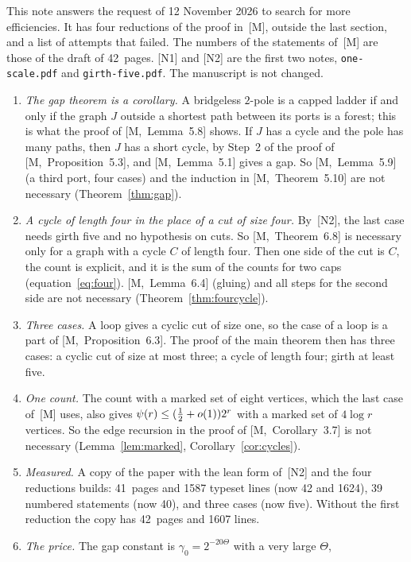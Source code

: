 \documentclass[11pt]{article}
\newcommand{\M}[1]{[M,~#1]}
\begin{document}
\maketitleblock

This note answers the request of 12 November 2026 to search for more efficiencies. It has four
reductions of the proof in~[M], outside the last section, and a list of attempts that failed.
The numbers of the statements of~[M] are those of the draft of 42~pages. [N1] and [N2] are the
first two notes, \texttt{one-scale.pdf} and \texttt{girth-five.pdf}. The manuscript is not changed.

\begin{enumerate}[leftmargin=1.6em]
\item \emph{The gap theorem is a corollary.} A bridgeless $2$-pole is a capped ladder if and only
if the graph $J$ outside a shortest path between its ports is a forest; this is what the proof of
\M{Lemma~5.8} shows. If $J$ has a cycle and the pole has many paths, then $J$ has a short cycle,
by Step~2 of the proof of \M{Proposition~5.3}, and \M{Lemma~5.1} gives a gap. So
\M{Lemma~5.9} (a third port, four cases) and the induction in \M{Theorem~5.10} are not necessary
(Theorem~\ref{thm:gap}).
\item \emph{A cycle of length four in the place of a cut of size four.} By~[N2], the last case
needs girth five and no hypothesis on cuts. So \M{Theorem~6.8} is necessary only for a graph with
a cycle $C$ of length four. Then one side of the cut is $C$, the count is explicit, and it is the
sum of the counts for two caps (equation~\eqref{eq:four}). \M{Lemma~6.4} (gluing) and all steps
for the second side are not necessary (Theorem~\ref{thm:fourcycle}).
\item \emph{Three cases.} A loop gives a cyclic cut of size one, so the case of a loop is a part
of \M{Proposition~6.3}. The proof of the main theorem then has three cases: a cyclic cut of size
at most three; a cycle of length four; girth at least five.
\item \emph{One count.} The count with a marked set of eight vertices, which the last case of~[M]
uses, also gives $\psi(r)\le(\tfrac12+o(1))2^{r}$ with a marked set of $4\log r$ vertices. So the
edge recursion in the proof of \M{Corollary~3.7} is not necessary
(Lemma~\ref{lem:marked}, Corollary~\ref{cor:cycles}).
\item \emph{Measured.} A copy of the paper with the lean form of~[N2] and the four reductions
builds: 41~pages and 1587 typeset lines (now 42 and 1624), 39 numbered statements (now 40), and
three cases (now five). Without the first reduction the copy has 42~pages and 1607 lines.
\item \emph{The price.} The gap constant is $\gamma_0=2^{-20\Theta}$ with a very large $\Theta$,

\end{enumerate}
\end{document}
